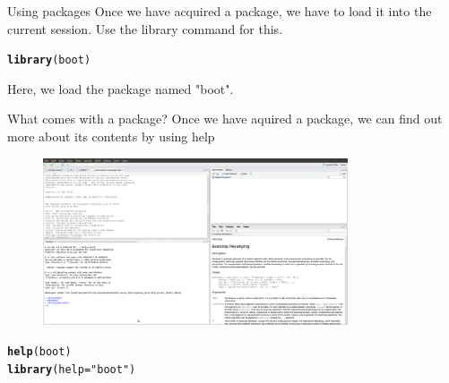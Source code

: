 \documentclass{beamer}\usepackage[]{graphicx}\usepackage[]{color}
\makeatletter
\newcommand{\hlstr}[1]{\textcolor[rgb]{0.192,0.494,0.8}{#1}}%
\newcommand{\hlstd}[1]{\textcolor[rgb]{0.345,0.345,0.345}{#1}}%
\newcommand{\hlkwc}[1]{\textcolor[rgb]{0.333,0.667,0.333}{#1}}%
\newcommand{\hlkwd}[1]{\textcolor[rgb]{0.737,0.353,0.396}{\textbf{#1}}}%
\newenvironment{kframe}{%
 \def\at@end@of@kframe{}%
 \ifinner\ifhmode%
  \def\at@end@of@kframe{\end{minipage}}%
  \begin{minipage}{\columnwidth}%
 \fi\fi%
 \def\FrameCommand##1{\hskip\@totalleftmargin \hskip-\fboxsep
 \colorbox{shadecolor}{##1}\hskip-\fboxsep
     \hskip-\linewidth \hskip-\@totalleftmargin \hskip\columnwidth}%
 \MakeFramed {\advance\hsize-\width
   \@totalleftmargin\z@ \linewidth\hsize
   \@setminipage}}%
 {\par\unskip\endMakeFramed%
 \at@end@of@kframe}
\newenvironment{knitrout}{}{} %
\makeatother
\begin{document}
\begin{frame}[fragile]{Using packages}
Once we have acquired a package, we have to load it into the current session. Use the library command for this.
\begin{knitrout}
\color{fgcolor}\begin{kframe}
\begin{alltt}
\hlkwd{library}\hlstd{(boot)}
\end{alltt}
\end{kframe}
\end{knitrout}
Here, we load the package named "boot".
\end{frame}


\begin{frame}[fragile]{What comes with a package?}
Once we have aquired a package, we can find out more about its contents by using help
\begin{figure}[ht!]
\centering
\includegraphics[width=90mm]{pictures/help_boot.png}
\label{overflow}
\end{figure}
\begin{knitrout}
\color{fgcolor}\begin{kframe}
\begin{alltt}
\hlkwd{help}\hlstd{(boot)}
\hlkwd{library}\hlstd{(}\hlkwc{help}\hlstd{=}\hlstr{"boot"}\hlstd{)}
\end{alltt}
\end{kframe}
\end{knitrout}
\end{frame}
\end{document}
